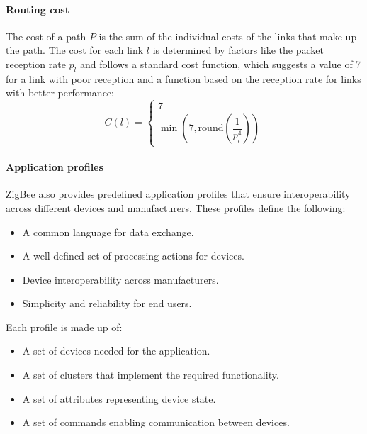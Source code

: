 \paragraph*{Routing cost}
The cost of a path $P$ is the sum of the individual costs of the links that make up the path. 
The cost for each link $l$ is determined by factors like the packet reception rate $p_l$ and follows a standard cost function, which suggests a value of 7 for a link with poor reception and a function based on the reception rate for links with better performance: 
\[C(l)=\begin{cases}
    7 \\ 
    \min\left(7,\text{round}\left(\dfrac{1}{p_l^4}\right)\right)
\end{cases}\]

\paragraph*{Application profiles}
ZigBee also provides predefined application profiles that ensure interoperability across different devices and manufacturers. 
These profiles define the following:
\begin{itemize}
    \item A common language for data exchange.
    \item A well-defined set of processing actions for devices.
    \item Device interoperability across manufacturers.
    \item Simplicity and reliability for end users.
\end{itemize}
\noindent Each profile is made up of:
\begin{itemize}
    \item A set of devices needed for the application.
    \item A set of clusters that implement the required functionality.
    \item A set of attributes representing device state.
    \item A set of commands enabling communication between devices.
\end{itemize}